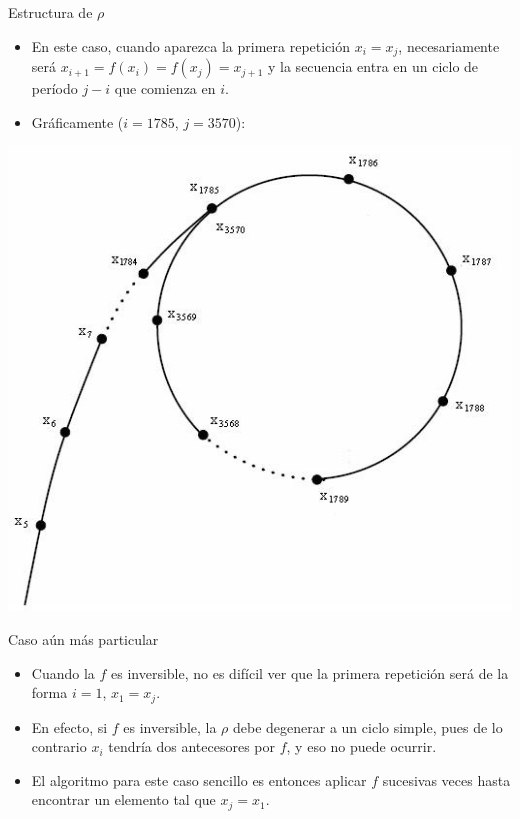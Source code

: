 \documentclass{beamer}
\begin{document}
\begin{frame}{Estructura de $\rho$}
    \begin{itemize}
    \item En este caso, cuando aparezca la primera repetición $x_i = x_j$, necesariamente será $x_{i+1} = f(x_i) = f(x_j) = x_{j+1}$ y la secuencia entra en un ciclo
     de período $j-i$ que comienza en $i$.
     \item Gráficamente ($i=1785$, $j=3570$):
    \end{itemize}
    {\hfill \includegraphics[scale=0.5]{rho_cycle.jpg} \hfill}
\end{frame}


\begin{frame}{Caso aún más particular}
    \begin{itemize}
    \item Cuando la $f$ es inversible, no es difícil ver que la primera repetición será de la forma $i=1$, $x_1 = x_j$.
    \item En efecto, si $f$ es inversible, la $\rho$ debe degenerar a un ciclo simple, pues de lo contrario $x_i$ tendría
           dos antecesores por $f$, y eso no puede ocurrir.
    \item El algoritmo para este caso sencillo es entonces aplicar $f$ sucesivas veces hasta encontrar un elemento tal que $x_j = x_1$.
    \end{itemize}
\end{frame}
\end{document}

